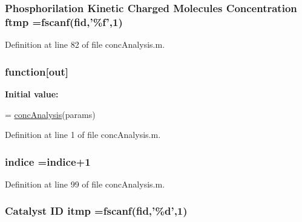 \hypertarget{a00025_ad82fa813707dc406b75a0b6e38d45a3e}{
\subsubsection[{ftmp}]{\setlength{\rightskip}{0pt plus 5cm}Phosphorilation Kinetic Charged Molecules Concentration ftmp ={\bf fscanf}({\bf fid},'\%{\bf f}',1)}}\label{a00025_ad82fa813707dc406b75a0b6e38d45a3e}


Definition at line 82 of file conc\+Analysis.\+m.

\hypertarget{a00025_a370f3dd25136a73d619eba0aa2e3bb4b}{
\subsubsection[{function}]{\setlength{\rightskip}{0pt plus 5cm}function\mbox{[}{\bf out}\mbox{]}}}\label{a00025_a370f3dd25136a73d619eba0aa2e3bb4b}
{\bfseries Initial value\+:}
\begin{DoxyCode}
= \hyperlink{a00036_a18a344cbdf9b3218a438bca78547ab9e}{concAnalysis}(params)
%
%
\end{DoxyCode}


Definition at line 1 of file conc\+Analysis.\+m.

\hypertarget{a00025_a776b2bbd08be028d44f6d4260f27633a}{
\subsubsection[{indice}]{ indice =indice+1}}\label{a00025_a776b2bbd08be028d44f6d4260f27633a}


Definition at line 99 of file conc\+Analysis.\+m.

\hypertarget{a00025_af17812863fb385a507b5b07ed6166569}{
\subsubsection[{itmp}]{\setlength{\rightskip}{0pt plus 5cm}Catalyst I\+D itmp ={\bf fscanf}({\bf fid},'\%d',1)}}\label{a00025_af17812863fb385a507b5b07ed6166569}


